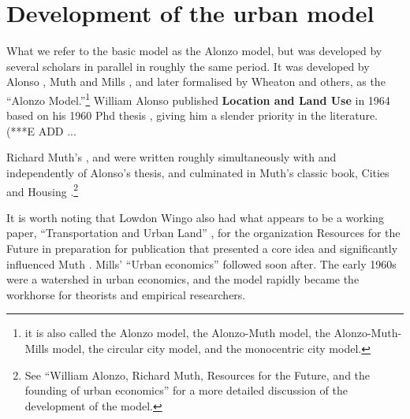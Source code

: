 \section{Development of the urban model}
What we refer to the basic model as the Alonzo model, but was developed by several scholars in parallel in roughly the same period. 
It was developed by 
Alonso \cite{alonsoLocationLandUse1964}, Muth \cite{muthCitiesHousingSpatial1969} and Mills \cite{millsAggregativeModelResource1967}, and later formalised by Wheaton \cite{wheatonComparativeStaticAnalysis1974} and others, as the ``Alonzo Model.''\footnote{it is also called the Alonzo model, the Alonzo-Muth model, the Alonzo-Muth-Mills model, the circular city model, and the monocentric city model.} William Alonso published \textbf{Location and Land Use} in 1964  \cite{alonsoLocationLandUse1964} based on his 1960 Phd thesis \cite{alonsoModelUrbanLand1960},  
giving him a slender priority in the literature.  (***E ADD ... %

Richard Muth's \cite{muthSpatialStructureHousing1961}, and \cite{muthRationalExpectationsTheory1961}  were written roughly simultaneously with and independently of Alonso's thesis, and  culminated in Muth's classic book, Cities and Housing  \cite{muthCitiesHousingSpatial1969}.\footnote{See ``William Alonzo, Richard Muth, Resources for  the Future, and the founding of urban economics''\cite{mcdonaldWilliamAlonsoRichard2007} for a more detailed discussion of the development of the model.}  %

It is worth noting that Lowdon Wingo also had what appears to be a working paper, ``Transportation and Urban Land'' \cite{wingoTransportationUrbanLand1961}, for the organization Resources for the Future  in preparation for publication that presented a core idea and  significantly influenced Muth \cite{mcdonaldWilliamAlonsoRichard2007}. Mills' ``Urban economics'' \cite{millsUrbanEconomics1972} followed soon after. The early 1960s were a watershed in urban economics, and the model rapidly became the workhorse for theorists and empirical researchers.

